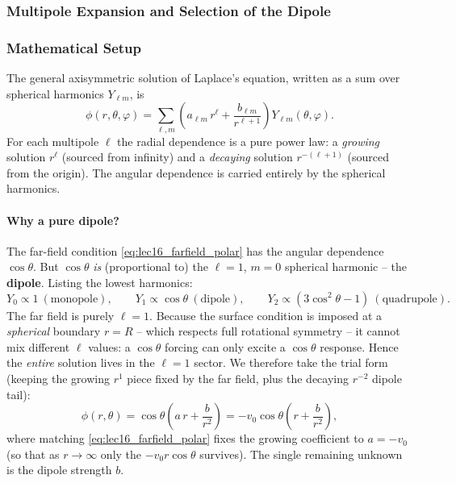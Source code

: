 \documentclass[../main.tex]{subfiles}
\begin{document}
\subsubsection{Multipole Expansion and Selection of the Dipole}

\subsubsection*{Mathematical Setup}
The general axisymmetric solution of Laplace's equation, written as a sum over spherical harmonics $Y_{\ell m}$, is
\begin{equation}
  \phi(r,\theta,\varphi) = \sum_{\ell,m}\left(a_{\ell m}\,r^{\ell} + \frac{b_{\ell m}}{r^{\ell+1}}\right)Y_{\ell m}(\theta,\varphi).
  \label{eq:lec16_multipole}
\end{equation}
For each multipole $\ell$ the radial dependence is a pure power law: a \emph{growing} solution $r^{\ell}$ (sourced from infinity) and a \emph{decaying} solution $r^{-(\ell+1)}$ (sourced from the origin). The angular dependence is carried entirely by the spherical harmonics.

\paragraph{Why a pure dipole?}
The far-field condition \eqref{eq:lec16_farfield_polar} has the angular dependence $\cos\theta$. But $\cos\theta$ \emph{is} (proportional to) the $\ell=1$, $m=0$ spherical harmonic -- the \textbf{dipole}. Listing the lowest harmonics:
\begin{equation}
  Y_{0}\propto 1\ (\text{monopole}),\qquad Y_{1}\propto\cos\theta\ (\text{dipole}),\qquad Y_2\propto(3\cos^2\theta-1)\ (\text{quadrupole}).
  \label{eq:lec16_harmonics}
\end{equation}
The far field is purely $\ell=1$. Because the surface condition is imposed at a \emph{spherical} boundary $r=R$ -- which respects full rotational symmetry -- it cannot mix different $\ell$ values: a $\cos\theta$ forcing can only excite a $\cos\theta$ response. Hence the \emph{entire} solution lives in the $\ell=1$ sector. We therefore take the trial form (keeping the growing $r^1$ piece fixed by the far field, plus the decaying $r^{-2}$ dipole tail):
\begin{equation}
  \phi(r,\theta) = \cos\theta\left(a\, r + \frac{b}{r^2}\right) = -v_0\cos\theta\left(r + \frac{b}{r^2}\right),
  \label{eq:lec16_trial}
\end{equation}
where matching \eqref{eq:lec16_farfield_polar} fixes the growing coefficient to $a=-v_0$ (so that as $r\to\infty$ only the $-v_0 r\cos\theta$ survives). The single remaining unknown is the dipole strength $b$.
\end{document}
